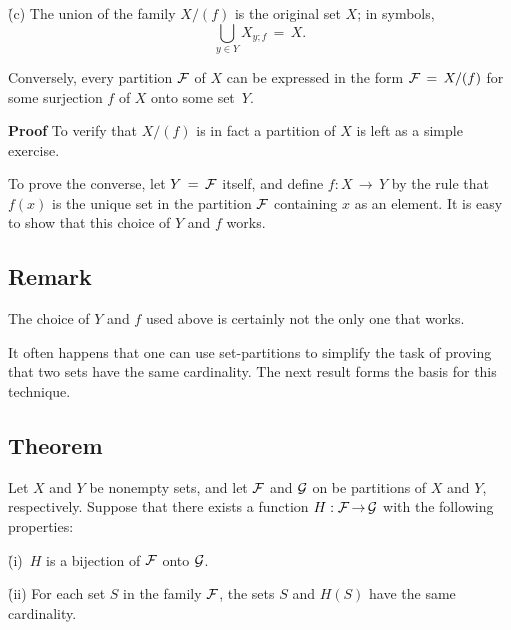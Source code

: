 {        \h (c) The union of the family $X/(f)$ is the original set $X$; in symbols,
        \begin{displaymath}
        {\bigcup}_{y{\in}Y} X_{y;f} \,=\, X.
        \end{displaymath}

\V

        Conversely, every partition ${\cal F}$ of $X$ can be expressed in the form ${\cal F} \,=\, X/(f)$ for some surjection $f$ of $X$ onto some set~$Y$.

\V

        {\bf Proof} To verify that $X/(f)$ is in fact a partition of $X$ is left as a simple exercise.

    To prove the converse, let $Y \,=\, {\cal F}$ itself, and define $f:X \,{\rightarrow}\, Y$
    by the rule that $f(x)$ is the unique set in the partition ${\cal F}$ containing $x$ as an element.
    It is easy to show that this choice of $Y$ and $f$ works.

\V
\V


        \subsection{\small{{\bf Remark}}}
        \label{RemrkA50.87}

\V

\hspace*{\parindent} The choice of $Y$ and $f$ used above is certainly not the only one that works.


\V
\V

        It often happens that one can use set-partitions to simplify the task of proving that two sets have the same cardinality.
    The next result forms the basis for this technique.

\V

        \subsection{\small{{\bf Theorem}}}
        \label{ThmA50.88A}

\V

        Let $X$ and $Y$ be nonempty sets, and let ${\cal F}$ and ${\cal G}$ on be partitions of $X$ and $Y$, respectively.
    Suppose that there exists a function $H:{\cal F} \,{\rightarrow}\, {\cal G}$ with the following properties:

        \h (i)\, $H$ is a bijection of ${\cal F}$ onto ${\cal G}$.

        \h (ii) For each set $S$ in the family ${\cal F}$, the sets $S$ and $H(S)$ have the same cardinality.

}
